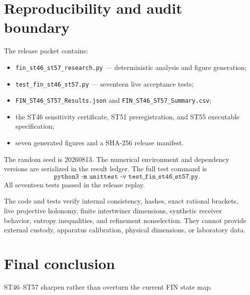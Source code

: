 \documentclass[11pt,a4paper]{article}
\begin{document}
\section{Reproducibility and audit boundary}

The release packet contains:
\begin{itemize}
\item \texttt{fin\_st46\_st57\_research.py} --- deterministic analysis and figure generation;
\item \texttt{test\_fin\_st46\_st57.py} --- seventeen live acceptance tests;
\item \texttt{FIN\_ST46\_ST57\_Results.json} and \texttt{FIN\_ST46\_ST57\_Summary.csv};
\item the ST46 sensitivity certificate, ST51 preregistration, and ST55 executable specification;
\item seven generated figures and a SHA-256 release manifest.
\end{itemize}

The random seed is 20260813. The numerical environment and dependency versions are serialized in the result ledger. The full test command is
\[
\texttt{python3 -m unittest -v test\_fin\_st46\_st57.py}.
\]
All seventeen tests passed in the release replay.

The code and tests verify internal consistency, hashes, exact rational brackets, live projective holonomy, finite intertwiner dimensions, synthetic receiver behavior, entropy inequalities, and refinement nonselection. They cannot provide external custody, apparatus calibration, physical dimensions, or laboratory data.

\section{Final conclusion}

ST46--ST57 sharpen rather than overturn the current FIN state map.
\end{document}
